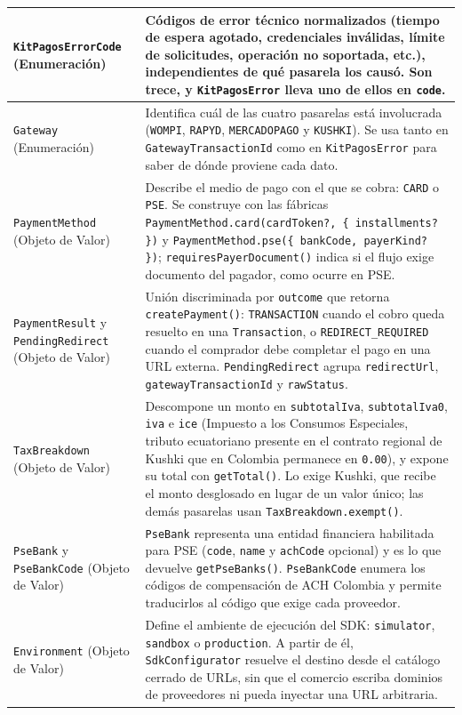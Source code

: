 \begin{longtable}{|>{\raggedright\arraybackslash}p{}|p{}|}
\texttt{KitPagos\allowbreak{}Error\allowbreak{}Code} (Enumeración) & Códigos de error técnico normalizados (tiempo de espera agotado, credenciales inválidas, límite de solicitudes, operación no soportada, etc.), independientes de qué pasarela los causó. Son trece, y \texttt{KitPagosError} lleva uno de ellos en \texttt{code}. \\ \hline
\texttt{Gateway} (Enumeración) & Identifica cuál de las cuatro pasarelas está involucrada (\texttt{WOMPI}, \texttt{RAPYD}, \texttt{MERCADOPAGO} y \texttt{KUSHKI}). Se usa tanto en \texttt{GatewayTransactionId} como en \texttt{KitPagosError} para saber de dónde proviene cada dato. \\ \hline
\texttt{Payment\allowbreak{}Method} (Objeto de Valor) & Describe el medio de pago con el que se cobra: \texttt{CARD} o \texttt{PSE}. Se construye con las fábricas \texttt{PaymentMethod.card(cardToken?, \{ installments? \})} y \texttt{PaymentMethod.pse(\{ bankCode, payerKind? \})}; \texttt{requiresPayerDocument()} indica si el flujo exige documento del pagador, como ocurre en PSE. \\ \hline
\texttt{Payment\allowbreak{}Result} y \texttt{Pending\allowbreak{}Redirect} (Objeto de Valor) & Unión discriminada por \texttt{outcome} que retorna \texttt{createPayment()}: \texttt{TRANSACTION} cuando el cobro queda resuelto en una \texttt{Transaction}, o \texttt{REDIRECT\_REQUIRED} cuando el comprador debe completar el pago en una URL externa. \texttt{PendingRedirect} agrupa \texttt{redirectUrl}, \texttt{gatewayTransactionId} y \texttt{rawStatus}. \\ \hline
\texttt{Tax\allowbreak{}Breakdown} (Objeto de Valor) & Descompone un monto en \texttt{subtotalIva}, \texttt{subtotalIva0}, \texttt{iva} e \texttt{ice} (Impuesto a los Consumos Especiales, tributo ecuatoriano presente en el contrato regional de Kushki que en Colombia permanece en \texttt{0.00}), y expone su total con \texttt{getTotal()}. Lo exige Kushki, que recibe el monto desglosado en lugar de un valor único; las demás pasarelas usan \texttt{TaxBreakdown.exempt()}. \\ \hline
\texttt{PseBank} y \texttt{PseBank\allowbreak{}Code} (Objeto de Valor) & \texttt{PseBank} representa una entidad financiera habilitada para PSE (\texttt{code}, \texttt{name} y \texttt{achCode} opcional) y es lo que devuelve \texttt{getPseBanks()}. \texttt{PseBankCode} enumera los códigos de compensación de ACH Colombia y permite traducirlos al código que exige cada proveedor. \\ \hline
\texttt{Environment} (Objeto de Valor) & Define el ambiente de ejecución del SDK: \texttt{simulator}, \texttt{sandbox} o \texttt{production}. A partir de él, \texttt{SdkConfigurator} resuelve el destino desde el catálogo cerrado de URLs, sin que el comercio escriba dominios de proveedores ni pueda inyectar una URL arbitraria. \\ \hline

\end{longtable}

